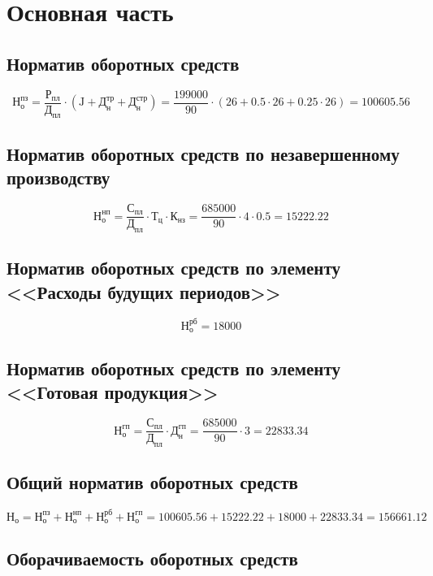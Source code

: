\chapter{Основная часть}

\section{Норматив оборотных средств}

\[
\text{Н}_\text{о}^\text{пз}=\frac{\text{Р}_\text{пл}}{\text{Д}_\text{пл}} \cdot (\text{J}+\text{Д}_\text{н}^\text{тр}+\text{Д}_\text{н}^\text{стр})= \frac{199000}{90} \cdot (26 + 0.5 \cdot 26 + 0.25 \cdot 26)=100605.56
\]

\section{Норматив оборотных средств по незавершенному производству}
\[
\text{Н}_\text{о}^\text{нп} = \frac{\text{С}_\text{пл}}{\text{Д}_\text{пл}} \cdot \text{Т}_\text{ц} \cdot \text{К}_\text{нз}=\frac{685000}{90} \cdot 4 \cdot 0.5 = 15222.22
\]

\section{Норматив оборотных средств по элементу <<Расходы будущих периодов>>}

\[
\text{Н}_\text{о}^\text{рб}=18000
\]

\section{Норматив оборотных средств по элементу <<Готовая продукция>>}

\[
\text{Н}_\text{о}^\text{гп} =  \frac{\text{С}_\text{пл}}{\text{Д}_\text{пл}} \cdot \text{Д}_\text{н}^\text{гп}=\frac{685000}{90} \cdot 3 = 22833.34
\]

\section{Общий норматив оборотных средств}

\[
\text{Н}_\text{о}=\text{Н}_\text{о}^\text{пз}+\text{Н}_\text{о}^\text{нп}+\text{Н}_\text{о}^\text{рб}+\text{Н}_\text{о}^\text{гп}=100 605.56+152 22.22+18 000+22 833.34=156661.12
\]

\section{Оборачиваемость оборотных средств}

